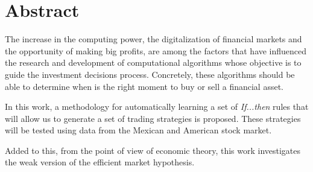 \documentclass[12pt]{report}
\theoremstyle{break}
\theoremstyle{break}
\begin{document}
\chapter*{Abstract}
The increase in the computing power, the digitalization of financial markets and the opportunity of making big profits, are among the factors that have influenced the research and development of computational algorithms whose objective is to guide the investment decisions process. Concretely, these algorithms should be able to determine when is the right moment to buy or sell a financial asset.

In this work, a methodology for automatically learning a set of \textit{If...then} rules that will allow us to generate a set of trading strategies is proposed. These strategies will be tested using data from the Mexican and American stock market.

Added to this, from the point of view of economic theory, this work investigates the weak version of the efficient market hypothesis.



\end{document}

